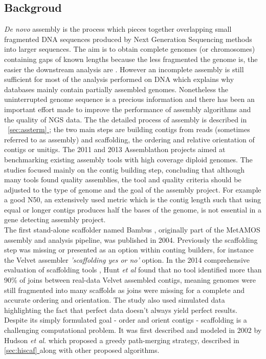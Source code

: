 \documentclass[12pt, twocolumn]{article}
\newcommand*{\fulleref}[1]{\hyperref[{#1}]{\autoref*{#1} \nameref*{#1}}}
\begin{document}
\subsection{Backgroud}
\textit{De novo} assembly is the process which pieces together overlapping small fragmented DNA sequences produced by Next Generation Sequencing methods into larger sequences. The aim is to obtain complete genomes (or chromosomes) containing gaps of known lengths because the less fragmented the genome is, the easier the downstream analysis are \cite{hunt_comprehensive_2014}. However an incomplete assembly is still sufficient for most of the analysis performed on DNA which explains why databases mainly contain partially assembled genomes. Nonetheless the uninterrupted genome sequence is a precious information and there has been an important effort made to improve the performance of assembly algorithms and the quality of NGS data. The the detailed process of assembly is described in ~\fulleref{sec:assterm}; the two main steps are building contigs from reads (sometimes referred to as assembly) and scaffolding, the ordering and relative orientation of contigs or unitigs. The 2011 and 2013 Assemblathon projects \cite{earl_assemblathon_2011} \cite{bradnam_assemblathon_2013} aimed at  benchmarking existing assembly tools with high coverage diploid genomes. The studies focused mainly on the contig building step, concluding that although many tools found quality assemblies, the tool and quality criteria should be adjusted to the type of genome and the goal of the assembly project. For example a good N50, an extensively used metric which is the contig length such that using equal or longer contigs produces half the bases of the genome, is not essential in a gene detecting assembly project. \\
The first stand-alone scaffolder named Bambus \cite{pop_hierarchical_2004}, originally part of the MetAMOS \cite{treangen_metamos:_2013} assembly and analysis pipeline, was published in 2004. Previously the scaffolding step was missing or presented as an option within conting builders, for instance the Velvet\cite{zerbino_velvet:_2008} assembler \textit{'scaffolding yes or no'} option. In the 2014 comprehensive evaluation of scaffolding tools \cite{hunt_comprehensive_2014-1}, Hunt \textit{et al} found that no tool identified more than 90\% of joins between real-data Velvet assembled contigs, meaning genomes were still fragmented into many scaffolds as joins were missing for a complete and accurate ordering and orientation. The study also used simulated data highlighting the fact that perfect data doesn't always yield perfect results. Despite its simply formulated goal - order and orient contigs - scaffolding is a challenging computational problem. It was first described and modeled in 2002 by Hudson \textit{et al.}\cite{huson_greedy_2002} which proposed a greedy path-merging strategy, described in \fulleref{sec:hiscaf} along with other proposed algorithms.
 
\end{document}
